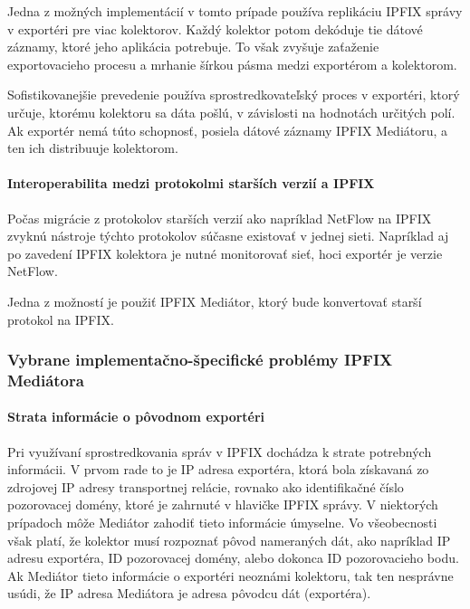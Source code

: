Jedna z možných implementácií v tomto prípade používa replikáciu IPFIX správy v exportéri 
pre viac kolektorov. Každý kolektor potom dekóduje tie dátové záznamy, ktoré jeho aplikácia
potrebuje. To však zvyšuje zaťaženie exportovacieho procesu a mrhanie šírkou pásma medzi
exportérom a kolektorom.

Sofistikovanejšie prevedenie používa sprostredkovateľský proces v exportéri, ktorý určuje, 
ktorému kolektoru sa dáta pošlú, v závislosti na hodnotách určitých polí. Ak exportér nemá
túto schopnosť, posiela dátové záznamy IPFIX Mediátoru, a ten ich distribuuje kolektorom.

\paragraph{Interoperabilita medzi protokolmi starších verzií a IPFIX}

Počas migrácie z protokolov starších verzií ako napríklad NetFlow \citep{rfc3954} na IPFIX
zvyknú nástroje týchto protokolov súčasne existovať v jednej sieti. Napríklad aj po zavedení 
IPFIX kolektora je nutné monitorovať sieť, hoci exportér je verzie NetFlow.

Jedna z možností je použiť IPFIX Mediátor, ktorý bude konvertovať starší protokol na IPFIX.


\subsubsection{Vybrane implementačno-špecifické problémy IPFIX Mediátora} \label{sec:problems}

\paragraph{Strata informácie o pôvodnom exportéri} \label{sec:loss_info}

Pri využívaní sprostredkovania správ v IPFIX dochádza k strate potrebných informácii. V prvom rade to je 
IP adresa exportéra, ktorá bola získavaná zo zdrojovej IP adresy transportnej relácie, rovnako 
ako identifikačné číslo pozorovacej domény, ktoré je zahrnuté v hlavičke IPFIX správy.
V niektorých prípadoch môže Mediátor zahodiť tieto informácie úmyselne. 
Vo všeobecnosti však platí, že kolektor musí rozpoznať pôvod nameraných dát, ako napríklad IP adresu 
exportéra, ID pozorovacej domény, alebo dokonca ID pozorovacieho bodu. Ak Mediátor tieto informácie 
o exportéri neoznámi kolektoru, tak ten nesprávne usúdi, že IP adresa Mediátora je adresa pôvodcu dát 
(exportéra).

